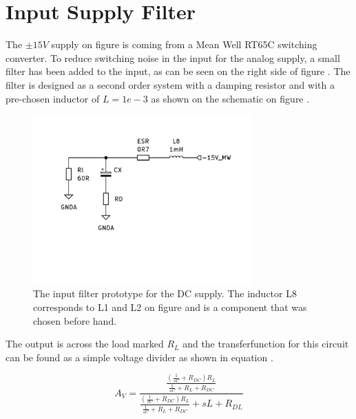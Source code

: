 \section{Input Supply Filter} \label{subsec:SupplyFilter}

The $\pm 15V$ supply on figure  is coming from a Mean Well RT65C switching converter. To reduce switching noise in the input for the analog supply, a small filter has been added to the input, as can be seen on the right side of figure . The filter is designed as a second order system with a damping resistor and with a pre-chosen inductor of $L = 1e-3$ as shown on the schematic on figure .

\begin{figure}[H]
    \centering
    \includegraphics[clip, trim=0 150 0 0, width=0.75\textwidth]{Sections/7_SystemDesign/Figures/7_1_5_SupplyFilterSch.pdf}
    \caption{The input filter prototype for the DC supply. The inductor L8 corresponds to L1 and L2 on figure  and is a component that was chosen before hand.}
    \label{fig_7_1_5_SupplyFilterSch}
\end{figure}

The output is across the load marked $R_L$ and the transferfunction for this circuit can be found as a simple voltage divider as shown in equation .

\begin{equation}\label{eq:7_1_5_FILTF}
    A_V = \frac{    \frac{     (\frac{1}{sC} + R_{DC})R_L     }{  \frac{1}{sC} + R_L + R_{DC}  }      }{ \frac{     (\frac{1}{sC} + R_{DC})R_L     }{  \frac{1}{sC} + R_L + R_{DC}  }   + sL + R_{DL}}
\end{equation}

